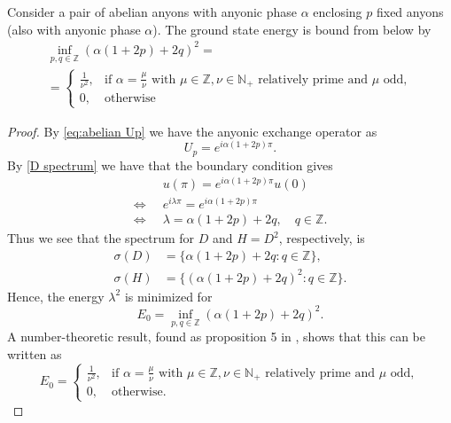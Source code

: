 \begin{proposition}
  Consider a pair of abelian anyons with anyonic phase $\alpha$ enclosing $p$ fixed anyons (also with anyonic phase $\alpha$).
  The ground state energy is bound from below by
    \begin{gather*}
      \inf_{p,q\in\mathbb{Z}} \left(\alpha(1+2p)+2q\right)^2 =\\
      = \begin{cases}
        \frac{1}{\nu^2}, & \text{if $\alpha = \frac{\mu}{\nu}$ with $\mu \in \mathbb{Z}, \nu \in \mathbb{N}_+$ relatively prime and $\mu$ odd}, \\
        0, & \text{otherwise}
      \end{cases}
    \end{gather*}
\end{proposition}

\begin{proof}
  By \cref{eq:abelian Up} we have the anyonic exchange operator as
  \begin{equation}
    U_p = e^{i\alpha(1+2p)π}.
  \end{equation}
  By \cref{D spectrum} we have that the boundary condition gives
  \begin{equation}
    \begin{aligned}
      &u(π) = e^{i\alpha(1+2p)π} u(0) \\
      \iff\;\; &e^{iλ π} = e^{i\alpha(1+2p)π} \\
      \iff\;\; &λ = \alpha(1+2p) + 2q, \quad q \in \mathbb{Z}.
    \end{aligned}
  \end{equation}
  Thus we see that the spectrum for $D$ and $H = D^2$, respectively, is
  \begin{equation}
    \begin{aligned}
      σ(D) &= \{ \alpha(1+2p) + 2q : q \in \mathbb{Z}\}, \\
      σ(H) &= \{ (\alpha(1+2p) + 2q)^2 : q \in \mathbb{Z}\}.
    \end{aligned}
  \end{equation}
  Hence, the energy $λ^2$ is minimized for
  \begin{equation}
    E_0 = \inf_{p,q\in\mathbb{Z}} (\alpha(1+2p)+2q)^2.
  \end{equation}
  A number-theoretic result, found as proposition 5 in \cite{lundholm-solovej}, shows that this can be written as
  \begin{equation}
    E_0 =
    \begin{cases}
      \frac{1}{\nu^2}, & \text{if $\alpha = \frac{\mu}{\nu}$ with $\mu \in \mathbb{Z}, \nu \in \mathbb{N}_+$ relatively prime and $\mu$ odd}, \\
      0, & \text{otherwise}.
    \end{cases}
  \end{equation}
\end{proof}

